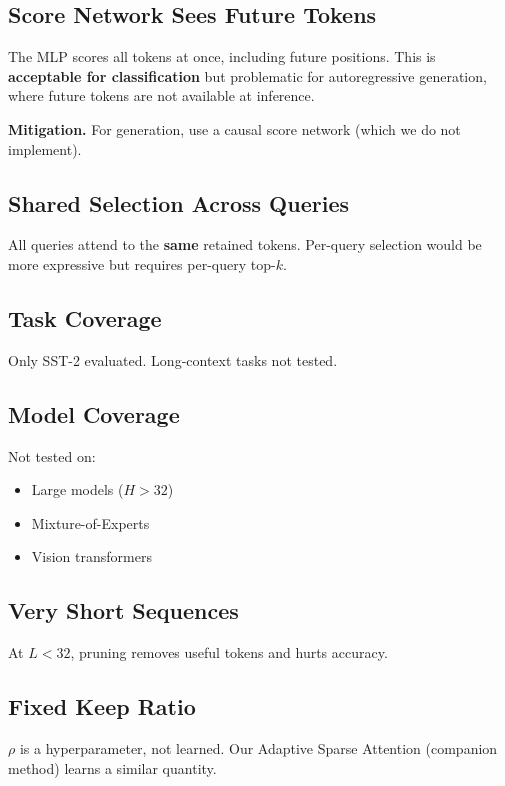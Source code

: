 {\subsection{Score Network Sees Future Tokens}

The MLP scores all tokens at once, including future positions. This is 
\textbf{acceptable for classification} but problematic for autoregressive 
generation, where future tokens are not available at inference.

\textbf{Mitigation.} For generation, use a causal score network (which we do 
not implement).

\subsection{Shared Selection Across Queries}

All queries attend to the \textbf{same} retained tokens. Per-query selection 
would be more expressive but requires per-query top-$k$.

\subsection{Task Coverage}

Only SST-2 evaluated. Long-context tasks not tested.

\subsection{Model Coverage}

Not tested on:
\begin{itemize}
\item Large models ($H > 32$)
\item Mixture-of-Experts
\item Vision transformers

\end{itemize}
\subsection{Very Short Sequences}

At $L < 32$, pruning removes useful tokens and hurts accuracy.

\subsection{Fixed Keep Ratio}

$\rho$ is a hyperparameter, not learned. Our Adaptive Sparse Attention 
(companion method) learns a similar quantity.

}
